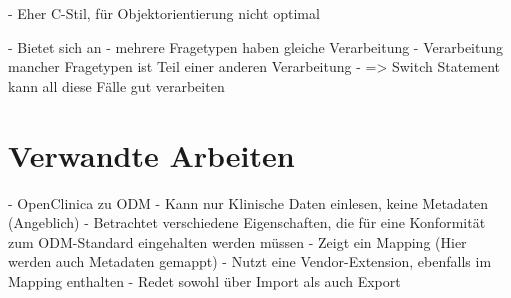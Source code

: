 - Eher C-Stil, für Objektorientierung nicht optimal

- Bietet sich an
	- mehrere Fragetypen haben gleiche Verarbeitung
	- Verarbeitung mancher Fragetypen ist Teil einer anderen Verarbeitung
- => Switch Statement kann all diese Fälle gut verarbeiten


\section{Verwandte Arbeiten}

- OpenClinica zu ODM
	- Kann nur Klinische Daten einlesen, keine Metadaten (Angeblich)
	- Betrachtet verschiedene Eigenschaften, die für eine Konformität zum ODM-Standard eingehalten werden müssen
	- Zeigt ein Mapping (Hier werden auch Metadaten gemappt)
	- Nutzt eine Vendor-Extension, ebenfalls im Mapping enthalten
	- Redet sowohl über Import als auch Export
